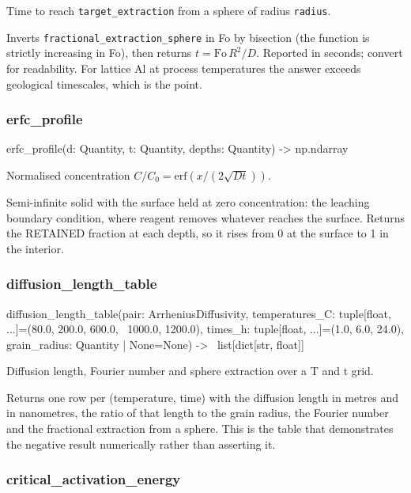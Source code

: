 \documentclass[10pt,a4paper,twoside]{report}
\begin{document}
Time to reach \texttt{target\_extraction} from a sphere of radius \texttt{radius}.

Inverts \texttt{fractional\_extraction\_sphere} in Fo by bisection (the function is strictly increasing in Fo), then returns $t = \mathrm{Fo}\,R^2/D$. Reported in seconds; convert for readability. For lattice Al at process temperatures the answer exceeds geological timescales, which is the point.

\subsubsection*{erfc\_profile}

\begin{verbatimsmall}
erfc_profile(d: Quantity, t: Quantity, depths: Quantity) -> np.ndarray
\end{verbatimsmall}

Normalised concentration $C/C_0 = \mathrm{erf}(x/(2\sqrt{Dt}))$.

Semi-infinite solid with the surface held at zero concentration: the leaching boundary condition, where reagent removes whatever reaches the surface. Returns the RETAINED fraction at each depth, so it rises from 0 at the surface to 1 in the interior.

\subsubsection*{diffusion\_length\_table}

\begin{verbatimsmall}
diffusion_length_table(pair: ArrheniusDiffusivity, temperatures_C: tuple[float, ...]=(80.0, 200.0, 600.0, 
    \ 1000.0, 1200.0), times_h: tuple[float, ...]=(1.0, 6.0, 24.0), grain_radius: Quantity | None=None) ->
    \  list[dict[str, float]]
\end{verbatimsmall}

Diffusion length, Fourier number and sphere extraction over a T and t grid.

Returns one row per (temperature, time) with the diffusion length in metres and in nanometres, the ratio of that length to the grain radius, the Fourier number and the fractional extraction from a sphere. This is the table that demonstrates the negative result numerically rather than asserting it.

\subsubsection*{critical\_activation\_energy}
\end{document}
